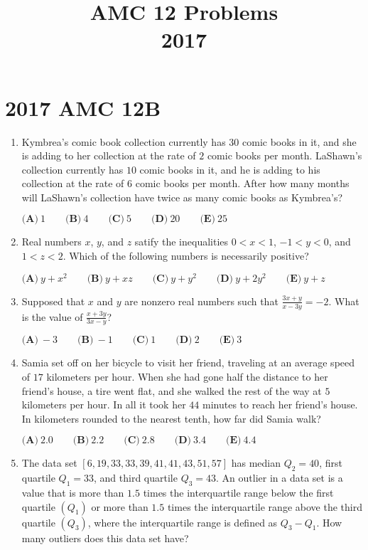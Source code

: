 \documentclass{article}
\title{AMC 12 Problems \\ 2017}
\date{}
\begin{document}
\maketitle\thispagestyle{fancy}\newpage\section*{2017 AMC 12B}\begin{enumerate}[label=\arabic*., itemsep=0.5em]\item Kymbrea's comic book collection currently has \(30\) comic books in it, and she is adding to her collection at the rate of \(2\) comic books per month. LaShawn's collection currently has \(10\) comic books in it, and he is adding to his collection at the rate of \(6\) comic books per month. After how many months will LaShawn's collection have twice as many comic books as Kymbrea's?

\(\textbf{(A)}\ 1\qquad\textbf{(B)}\ 4\qquad\textbf{(C)}\ 5\qquad\textbf{(D)}\ 20\qquad\textbf{(E)}\ 25\)\par \vspace{0.5em}\item Real numbers \(x\), \(y\), and \(z\) satify the inequalities
\(0<x<1\), \(-1<y<0\), and \(1<z<2\).
Which of the following numbers is necessarily positive?

\(\textbf{(A)}\ y+x^2\qquad\textbf{(B)}\ y+xz\qquad\textbf{(C)}\ y+y^2\qquad\textbf{(D)}\ y+2y^2\qquad\textbf{(E)}\ y+z\)\par \vspace{0.5em}\item Supposed that \(x\) and \(y\) are nonzero real numbers such that \(\frac{3x+y}{x-3y}=-2\). What is the value of \(\frac{x+3y}{3x-y}\)?

\(\textbf{(A)}\ -3\qquad\textbf{(B)}\ -1\qquad\textbf{(C)}\ 1\qquad\textbf{(D)}\ 2\qquad\textbf{(E)}\ 3\)\par \vspace{0.5em}\item Samia set off on her bicycle to visit her friend, traveling at an average speed of \(17\) kilometers per hour. When she had gone half the distance to her friend's house, a tire went flat, and she walked the rest of the way at \(5\) kilometers per hour. In all it took her \(44\) minutes to reach her friend's house. In kilometers rounded to the nearest tenth, how far did Samia walk?

\(\textbf{(A)}\ 2.0\qquad\textbf{(B)}\ 2.2\qquad\textbf{(C)}\ 2.8\qquad\textbf{(D)}\ 3.4\qquad\textbf{(E)}\ 4.4\)\par \vspace{0.5em}\item The data set \([6,19,33,33,39,41,41,43,51,57]\) has median \(Q_2 = 40\), first quartile \(Q_1 = 33\), and third quartile \(Q_3=43\). An outlier in a data set is a value that is more than \(1.5\) times the interquartile range below the first quartile \((Q_1)\) or more than \(1.5\) times the interquartile range above the third quartile \((Q_3)\), where the interquartile range is defined as \(Q_3 - Q_1\). How many outliers does this data set have?


\end{enumerate}
\end{document}
